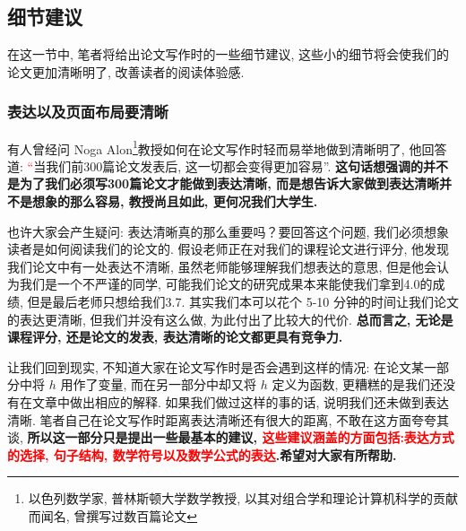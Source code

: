 \documentclass{formatBook}
\newcommand{\XG}[1]{\textcolor{red}{#1}}
\begin{document}
\subsection{细节建议}
在这一节中, 笔者将给出论文写作时的一些细节建议, 这些小的细节将会使我们的论文更加清晰明了, 改善读者的阅读体验感.
\subsubsection{表达以及页面布局要清晰}
有人曾经问 Noga Alon\footnote{以色列数学家, 普林斯顿大学数学教授, 以其对组合学和理论计算机科学的贡献而闻名, 曾撰写过数百篇论文}教授如何在论文写作时轻而易举地做到清晰明了, 他回答道: \XG{``}当我们前300篇论文发表后, 这一切都会变得更加容易''\cite{pakhow}. \textbf{这句话想强调的并不是为了我们必须写300篇论文才能做到表达清晰, 而是想告诉大家做到表达清晰并不是想象的那么容易, 教授尚且如此, 更何况我们大学生.} \par
也许大家会产生疑问: 表达清晰真的那么重要吗？要回答这个问题, 我们必须想象读者是如何阅读我们的论文的. 假设老师正在对我们的课程论文进行评分, 他发现我们论文中有一处表达不清晰, 虽然老师能够理解我们想表达的意思, 但是他会认为我们是一个不严谨的同学, 可能我们论文的研究成果本来能使我们拿到4.0的成绩, 但是最后老师只想给我们3.7. 其实我们本可以花个 5-10 分钟的时间让我们论文的表达更清晰, 但我们并没有这么做, 为此付出了比较大的代价. \textbf{总而言之, 无论是课程评分, 还是论文的发表, 表达清晰的论文都更具有竞争力.} \par
让我们回到现实, 不知道大家在论文写作时是否会遇到这样的情况: 在论文某一部分中将 $h$ 用作了变量, 而在另一部分中却又将 $h$ 定义为函数, 更糟糕的是我们还没有在文章中做出相应的解释. 如果我们做过这样的事的话, 说明我们还未做到表达清晰. 笔者自己在论文写作时距离表达清晰还有很大的距离, 不敢在这方面夸夸其谈, \textbf{所以这一部分只是提出一些最基本的建议, \XG{这些建议涵盖的方面包括:表达方式的选择, 句子结构, 数学符号以及数学公式的表达}.希望对大家有所帮助. }
\end{document}
